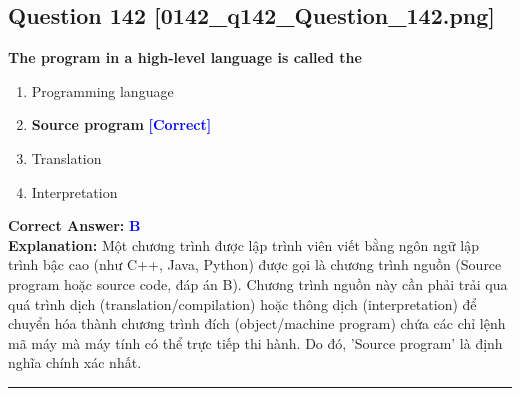 \documentclass[11pt,a4paper]{article}
\begin{document}
\begin{minipage}{\textwidth}
\subsection*{Question 142 \quad \footnotesize{[0142\_q142\_Question\_142.png]}}
\noindent \textbf{The program in a high-level language is called the}

\begin{enumerate}[label=\Alph*.]
    \item Programming language
    \item \textbf{Source program} \hfill \textcolor{blue}{\textbf{[Correct]}}
    \item Translation
    \item Interpretation
\end{enumerate}

\noindent \textbf{Correct Answer:} \textcolor{blue}{\textbf{B}} \\[2pt]
\noindent \textbf{Explanation:} Một chương trình được lập trình viên viết bằng ngôn ngữ lập trình bậc cao (như C++, Java, Python) được gọi là chương trình nguồn (Source program hoặc source code, đáp án B). Chương trình nguồn này cần phải trải qua quá trình dịch (translation/compilation) hoặc thông dịch (interpretation) để chuyển hóa thành chương trình đích (object/machine program) chứa các chỉ lệnh mã máy mà máy tính có thể trực tiếp thi hành. Do đó, 'Source program' là định nghĩa chính xác nhất.

\par\vspace{0.3cm}
\hrule
\vspace{0.3cm}
\end{minipage}
\end{document}
